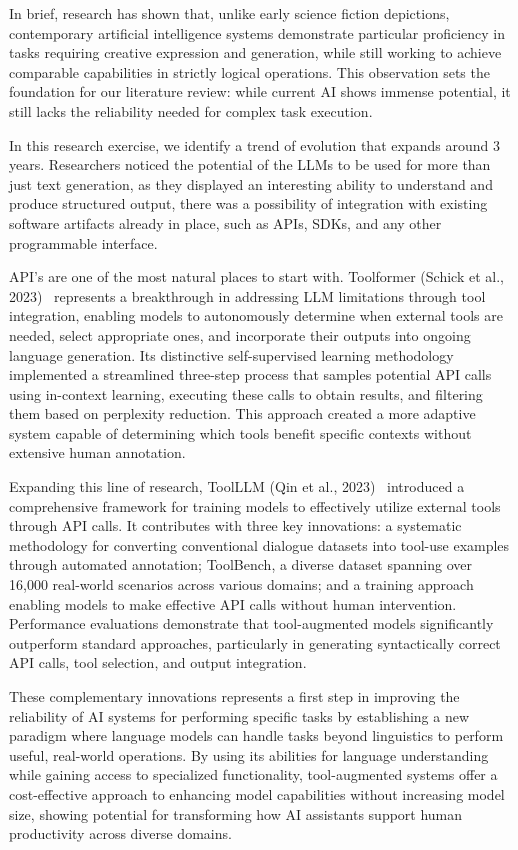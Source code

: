 \documentclass[journal,twoside,10pt]{IEEEtran}
\begin{document}
In brief, research has shown that, unlike early science fiction depictions, contemporary artificial intelligence systems demonstrate particular proficiency in tasks requiring creative expression and generation, while still working to achieve comparable capabilities in strictly logical operations. This observation sets the foundation for our literature review: while current AI shows immense potential, it still lacks the reliability needed for complex task execution.

In this research exercise, we identify a trend of evolution that expands around 3 years. Researchers noticed the potential of the LLMs to be used for more than just text generation, as they displayed an interesting ability to understand and produce structured output, there was a possibility of integration with existing software artifacts already in place, such as APIs, SDKs, and any other programmable interface.

API's are one of the most natural places to start with.  Toolformer (Schick et al., 2023)~\cite{schick2023toolformer} represents a breakthrough in addressing LLM limitations through tool integration, enabling models to autonomously determine when external tools are needed, select appropriate ones, and incorporate their outputs into ongoing language generation. Its distinctive self-supervised learning methodology implemented a streamlined three-step process that samples potential API calls using in-context learning, executing these calls to obtain results, and filtering them based on perplexity reduction. This approach created a more adaptive system capable of determining which tools benefit specific contexts without extensive human annotation.

Expanding this line of research, ToolLLM (Qin et al., 2023)~\cite{qin2023toolllm} introduced a comprehensive framework for training models to effectively utilize external tools through API calls. It contributes with three key innovations: a systematic methodology for converting conventional dialogue datasets into tool-use examples through automated annotation; ToolBench, a diverse dataset spanning over 16,000 real-world scenarios across various domains; and a training approach enabling models to make effective API calls without human intervention. Performance evaluations demonstrate that tool-augmented models significantly outperform standard approaches, particularly in generating syntactically correct API calls, tool selection, and output integration.

These complementary innovations represents a first step in improving the reliability of AI systems for performing specific tasks by establishing a new paradigm where language models can handle tasks beyond linguistics to perform useful, real-world operations. By using its abilities for language understanding while gaining access to specialized functionality, tool-augmented systems offer a cost-effective approach to enhancing model capabilities without increasing model size, showing potential for transforming how AI assistants support human productivity across diverse domains.
\end{document}
